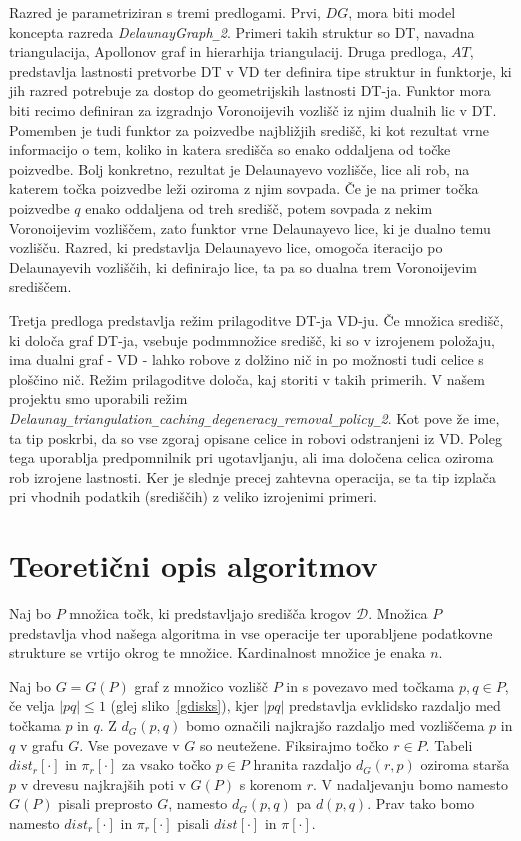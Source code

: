 \documentclass[a4paper, 12pt]{book}
\newcommand{\D}{\ensuremath{\mathcal{D}}}
\newcommand{\U}{\texttt{\_}}
\begin{document}
Razred je parametriziran s tremi predlogami. Prvi, $DG$, mora biti model koncepta razreda \textit{DelaunayGraph\U 2}. Primeri takih struktur so DT, navadna triangulacija, Apollonov graf in hierarhija triangulacij. Druga predloga, $AT$, predstavlja lastnosti pretvorbe DT v VD ter definira tipe struktur in funktorje, ki jih razred potrebuje za dostop do geometrijskih lastnosti DT-ja. Funktor mora biti recimo definiran za izgradnjo Voronoijevih vozlišč iz njim dualnih lic v DT. Pomemben je tudi funktor za poizvedbe najbližjih središč, ki kot rezultat vrne informacijo o tem, koliko in katera središča so enako oddaljena od točke poizvedbe. Bolj konkretno, rezultat je Delaunayevo vozlišče, lice ali rob, na katerem točka poizvedbe leži oziroma z njim sovpada. Če je na primer točka poizvedbe $q$ enako oddaljena od treh središč, potem sovpada z nekim Voronoijevim vozliščem, zato funktor vrne Delaunayevo lice, ki je dualno temu vozlišču. Razred, ki predstavlja Delaunayevo lice, omogoča iteracijo po Delaunayevih vozliščih, ki definirajo lice, ta pa so dualna trem Voronoijevim središčem.

Tretja predloga predstavlja režim prilagoditve DT-ja VD-ju. 
Če množica središč, ki določa graf DT-ja, vsebuje podmmnožice središč, ki so v izrojenem položaju, ima dualni graf - VD - lahko robove z dolžino nič in po možnosti tudi celice s ploščino nič. Režim prilagoditve določa, kaj storiti v takih primerih. V našem projektu smo uporabili režim \textit{Delaunay\U triangulation\U ca\-ching\U de\-ge\-ne\-ra\-cy\U re\-mo\-val\U po\-licy\U 2}. Kot pove že ime, ta tip poskrbi, da so vse zgoraj opisane celice in robovi odstranjeni iz VD. Poleg tega uporablja predpomnilnik pri ugotavljanju, ali ima določena celica oziroma rob izrojene lastnosti. Ker je slednje precej zahtevna operacija, se ta tip izplača pri vhodnih podatkih (središčih) z veliko izrojenimi primeri.



\chapter{Teoretični opis algoritmov}
Naj bo $P$ množica točk, ki predstavljajo središča krogov $\D$. Množica $P$ predstavlja vhod našega algoritma in vse operacije ter uporabljene podatkovne strukture se vrtijo okrog te množice. Kardinalnost množice je enaka $n$.

Naj bo $G=G(P)$ graf z množico vozlišč $P$ in s povezavo med točkama $p,q \in P$, če velja $|pq|\le 1$ (glej sliko~\ref{gdisks}), kjer $|pq|$ predstavlja evklidsko razdaljo med točkama $p$ in $q$. Z $d_G(p,q)$ bomo označili najkrajšo razdaljo med vozliščema $p$ in $q$ v grafu $G$. Vse povezave v $G$ so neutežene. Fiksirajmo točko $r\in P$. Tabeli $dist_r[\cdot]$ in $\pi_r[\cdot]$ za vsako točko $p\in P$ hranita razdaljo $d_G(r, p)$ oziroma starša $p$ v drevesu najkrajših poti v $G(P)$ s korenom $r$. V nadaljevanju bomo namesto $G(P)$ pisali preprosto $G$, namesto $d_G(p, q)$ pa $d(p, q)$. Prav tako bomo namesto $dist_r[\cdot]$ in $\pi_r[\cdot]$ pisali $dist[\cdot]$ in $\pi[\cdot]$.
\end{document}
